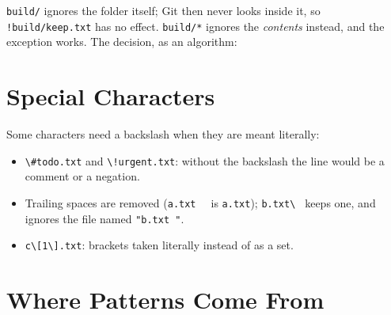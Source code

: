 \documentclass[11pt,a4paper]{article}
\begin{document}
\texttt{build/} ignores the folder itself; Git then never looks inside it, so \texttt{!build/keep.txt} has no effect.
\texttt{build/*} ignores the \emph{contents} instead, and the exception works. The decision, as an algorithm:


\begin{algorithm}[H]
  \caption{Is the path $p = d_{1}/d_{2}/\dots/d_{k}$ ignored?}
  \;
\end{algorithm}

\section{Special Characters}


Some characters need a backslash when they are meant literally:


\begin{itemize}
  \item \texttt{\textbackslash\#todo.txt} and \texttt{\textbackslash!urgent.txt}: without the backslash the line would be a comment or a negation.
  \item Trailing spaces are removed (\texttt{a.txt\ \ } is \texttt{a.txt}); \texttt{b.txt\textbackslash\ } keeps one, and ignores the file named \texttt{"b.txt "}.
  \item \texttt{c\textbackslash[1\textbackslash].txt}: brackets taken literally instead of as a set.
\end{itemize}



\section{Where Patterns Come From}
\end{document}
